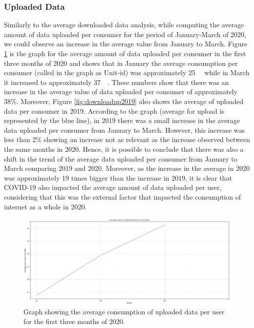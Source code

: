 \documentclass[conference,10pt]{IEEEtran}
\begin{document}
\subsubsection{Uploaded Data}
\label{sec:upload-data-consumption}

Similarly to the average downloaded data analysis, while computing the average amount of data uploaded per consumer for the period of January-March of 2020, we could observe an increase in the average value from January to March. Figure \ref{fig:upload2020} is the graph for the average amount of data uploaded per consumer in the first three months of 2020 and shows that in January the average consumption per consumer (called in the graph as Unit-id) was approximately \SI{25}{\giga\byte} while in March it increased to approximately \SI{37}{\giga\byte}. These numbers show that there was an increase in the average value of data uploaded per consumer of approximately 38\%. Moreover, Figure \ref{fig:downloadup2019} also shows the average of uploaded data per consumer in 2019. According to the graph (average for upload is represented by the blue line), in 2019 there was a small increase in the average data uploaded per consumer from January to March. However, this increase was less than 2\% showing an increase not as relevant as the increase observed between the same months in 2020. Hence, it is possible to conclude that there was also a shift in the trend of the average data uploaded per consumer from January to March comparing 2019 and 2020. Moreover, as the increase in the average in 2020 was approximately 19 times bigger than the increase in 2019, it is clear that COVID-19 also impacted the average amount of data uploaded per user, considering that this was the external factor that impacted the consumption of internet as a whole in 2020.

\begin{figure}
\centering
\includegraphics[width=1.0\linewidth]{figs/upload2020.PNG}
\caption{Graph showing the average consumption of uploaded data per user for the first three months of 2020.}
\label{fig:upload2020}
\end{figure}
\end{document}
